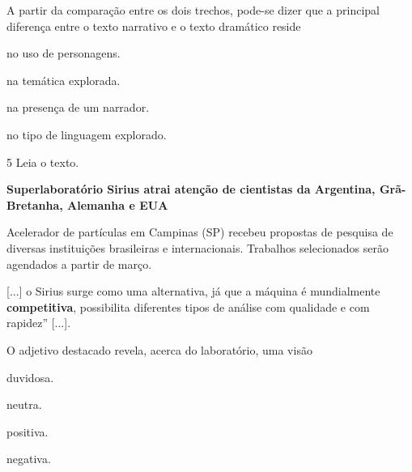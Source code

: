 \pagebreak
A partir da comparação entre os dois trechos, pode-se dizer que a
principal diferença entre o texto narrativo e o texto dramático reside

\begin{escolha}
\item no uso de personagens.

\item na temática explorada.

\item na presença de um narrador.

\item no tipo de linguagem explorado.
\end{escolha}


\num{5} Leia o texto.

\begin{myquote}
\textbf{Superlaboratório Sirius atrai atenção de cientistas da
Argentina, Grã-Bretanha, Alemanha e EUA}

Acelerador de partículas em Campinas (SP) recebeu propostas de
pesquisa de diversas instituições brasileiras e internacionais.
Trabalhos selecionados serão agendados a partir de março.

{[}...{]} o Sirius surge como uma alternativa, já que a máquina é
mundialmente \textbf{competitiva}, possibilita diferentes tipos de
análise com qualidade e com rapidez” {[}...{]}.

\end{myquote}

O adjetivo destacado revela, acerca do laboratório, uma visão

\begin{multicols}{2}
\begin{escolha}
\item duvidosa.

\item neutra.

\item positiva.

\item negativa.
\end{escolha}
\end{multicols}


